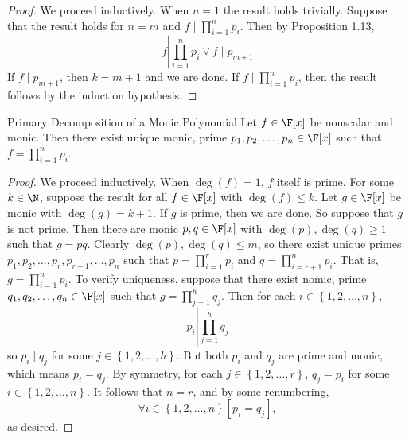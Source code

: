 \documentclass[math_245.tex]{subfiles}
\begin{document}
    \begin{proof}
        We proceed inductively. When $n=1$ the result holds trivially. Suppose that the result holds for $n=m$ and $f\mid \prod^n_{i=1} p_i$. Then by Proposition 1.13,
        \begin{equation*}
            f\left|\prod^n_{i=1} p_i \lor f\mid p_{m+1}\right.
        \end{equation*}
        If $f\mid p_{m+1}$, then $k=m+1$ and we are done. If $f\mid\prod^n_{i=1} p_i$, then the result follows by the induction hypothesis.
    \end{proof}

    \begin{theorem}{Primary Decomposition of a Monic Polynomial}
        Let $f\in \F[x]$ be nonscalar and monic. Then there exist unique monic, prime $p_1, p_2, \ldots, p_n\in \F[x]$ such that $f = \prod^n_{i=1} p_i$.
    \end{theorem}

    \begin{proof}
        We proceed inductively. When $\deg(f)=1$, $f$ itself is prime. For some $k\in \N$, suppose the result for all $f\in \F[x]$ with $\deg(f)\leq k$. Let $g\in \F[x]$ be monic with $\deg(g) = k+1$. If $g$ is prime, then we are done. So suppose that $g$ is not prime. Then there are monic $p, q\in \F[x]$ with $\deg(p),\deg(q)\geq 1$ such that $g=pq$. Clearly $\deg(p), \deg(q)\leq m$, so there exist unique primes $p_1, p_2, \ldots, p_r, p_{r+1}, \ldots, p_n$ such that $p =
        \prod^{r}_{i=1} p_i$ and $q = \prod^{n}_{i=r+1} p_i$. That is, $g = \prod^{n}_{i=1} p_i$. To verify uniqueness, suppose that there exist nomic, prime $q_1, q_2, \ldots, q_n\in \F[x]$ such that $g = \prod^{h}_{j=1} q_j$. Then for each $i\in \left\lbrace 1, 2, \ldots, n \right\rbrace$,
        \begin{equation*}
            p_i \left| \prod^{h}_{j=1} q_j\right. 
        \end{equation*}
        so $p_i\mid q_j$ for some $j\in \left\lbrace 1, 2, \ldots, h \right\rbrace$. But both $p_i$ and $q_j$ are prime and monic, which means $p_i = q_j$. By symmetry, for each $j\in \left\lbrace 1, 2, \ldots, r \right\rbrace$, $q_j = p_i$ for some $i\in \left\lbrace 1, 2, \ldots, n \right\rbrace$. It follows that $n = r$, and by some renumbering,
        \begin{equation*}
            \forall i\in \left\lbrace 1, 2, \ldots, n \right\rbrace \left[ p_i = q_j \right],
        \end{equation*}
        as desired.
    \end{proof}
\end{document}
